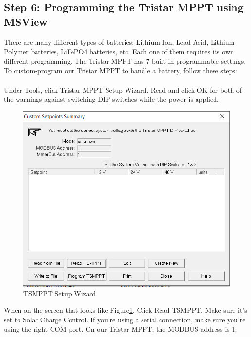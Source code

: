 \subsection{Step 6: Programming the Tristar MPPT using MSView}

There are many different types of batteries: Lithium Ion, Lead-Acid, Lithium Polymer batteries, LiFePO4 batteries, etc. Each one of them requires its own different programming. The Tristar MPPT has 7 built-in programmable settings. To custom-program our Tristar MPPT to handle a battery, follow these steps:
\paragraph{}
Under Tools, click Tristar MPPT Setup Wizard. Read and click OK for both of the warnings against switching DIP switches while the power is applied.
\begin{figure}[!htb]
	\centering
	\includegraphics[width=0.6\columnwidth,scale=0.8]{./graphics/tsmppt_troubleshooting/ms_3.png}
	\caption{\label{fig:ts_setup_wizard} TSMPPT Setup Wizard}
\end{figure}

When on the screen that looks like Figure\ref{fig:ts_setup_wizard}, Click Read TSMPPT. Make sure it’s set to Solar Charge Control. If you’re using a serial connection, make sure you’re using the right COM port.
On our Tristar MPPT, the MODBUS address is 1.


